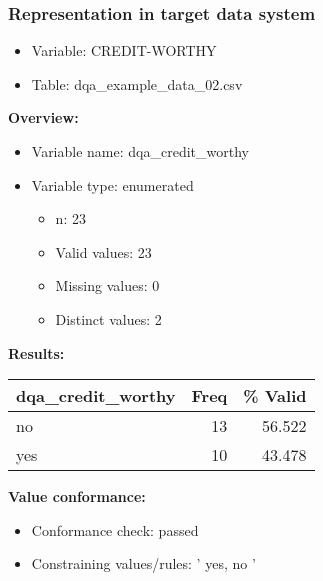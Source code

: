 \documentclass[
]{article}
\providecommand{\tightlist}{%
  \setlength{\itemsep}{0pt}\setlength{\parskip}{0pt}}
\begin{document}
\newpage

\hypertarget{representation-in-target-data-system-3}{%
\subsubsection{\texorpdfstring{Representation in \textbf{target} data
system}{Representation in target data system}}\label{representation-in-target-data-system-3}}

\begin{itemize}
\tightlist
\item
  Variable: CREDIT-WORTHY
\item
  Table: dqa\_example\_data\_02.csv
\end{itemize}

\textbf{Overview:}

\begin{itemize}
\tightlist
\item
  Variable name: dqa\_credit\_worthy
\item
  Variable type: enumerated

  \begin{itemize}
  \tightlist
  \item
    n: 23
  \item
    Valid values: 23
  \item
    Missing values: 0
  \item
    Distinct values: 2
  \end{itemize}
\end{itemize}

\textbf{Results:}\\

\begin{table}[H]
\centering
\begin{tabular}{l|r|r}
\hline
\textbf{dqa\_credit\_worthy} & \textbf{Freq} & \textbf{\% Valid}\\
\hline
no & 13 & 56.522\\
\hline
yes & 10 & 43.478\\
\hline
\end{tabular}
\end{table}

\textbf{Value conformance:}

\begin{itemize}
\tightlist
\item
  Conformance check: passed
\item
  Constraining values/rules: ' yes, no '
\end{itemize}
\end{document}
